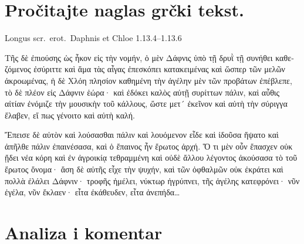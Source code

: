\section*{Pročitajte naglas grčki tekst.}

Longus scr.~erot.\ Daphnis et Chloe 1.13.4–1.13.6


\medskip


{\large

\begin{greek}

\noindent Τῆς δὲ ἐπιούσης ὡς ἧκον εἰς τὴν νομήν, ὁ μὲν Δάφνις ὑπὸ τῇ δρυῒ τῇ συνήθει καθεζόμενος ἐσύριττε καὶ ἅμα τὰς αἶγας ἐπεσκόπει κατακειμένας καὶ ὥσπερ τῶν μελῶν ἀκροωμένας, ἡ δὲ Χλόη πλησίον καθημένη τὴν ἀγέλην μὲν τῶν προβάτων ἐπέβλεπε, τὸ δὲ πλέον εἰς Δάφνιν ἑώρα· καὶ ἐδόκει καλὸς αὐτῇ συρίττων πάλιν, καὶ αὖθις αἰτίαν ἐνόμιζε τὴν μουσικὴν τοῦ κάλλους, ὥστε μετ´ ἐκεῖνον καὶ αὐτὴ τὴν σύριγγα ἔλαβεν, εἴ πως γένοιτο καὶ αὐτὴ καλή.

Ἔπεισε δὲ αὐτὸν καὶ λούσασθαι πάλιν καὶ λουόμενον εἶδε καὶ ἰδοῦσα ἥψατο καὶ ἀπῆλθε πάλιν ἐπαινέσασα, καὶ ὁ ἔπαινος ἦν ἔρωτος ἀρχή. Ὅ τι μὲν οὖν ἔπασχεν οὐκ ᾔδει νέα κόρη καὶ ἐν ἀγροικίᾳ τεθραμμένη καὶ οὐδὲ ἄλλου λέγοντος ἀκούσασα τὸ τοῦ ἔρωτος ὄνομα· ἄση δὲ αὐτῆς εἶχε τὴν ψυχήν, καὶ τῶν ὀφθαλμῶν οὐκ ἐκράτει καὶ πολλὰ ἐλάλει Δάφνιν· τροφῆς ἠμέλει, νύκτωρ ἠγρύπνει, τῆς ἀγέλης κατεφρόνει· νῦν ἐγέλα, νῦν ἔκλαεν· εἶτα ἐκάθευδεν, εἶτα ἀνεπήδα\dots

\end{greek}

}


\section*{Analiza i komentar}


